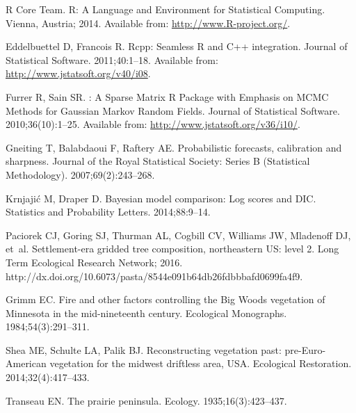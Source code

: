 \documentclass[10pt,letterpaper]{article}
\begin{document}
\begin{thebibliography}{10}
{R Core Team}. R: A Language and Environment for Statistical Computing.
\newblock Vienna, Austria; 2014.
\newblock Available from: \url{http://www.R-project.org/}.

Eddelbuettel D, Francois R.
\newblock Rcpp: {S}eamless {R} and {C}++ integration.
\newblock Journal of Statistical Software. 2011;40:1--18.
\newblock Available from: \url{http://www.jstatsoft.org/v40/i08}.

Furrer R, Sain SR.
: A Sparse Matrix {R} Package with Emphasis on {MCMC} Methods
  for {G}aussian {M}arkov Random Fields.
\newblock Journal of Statistical Software. 2010;36(10):1--25.
\newblock Available from: \url{http://www.jstatsoft.org/v36/i10/}.

Gneiting T, Balabdaoui F, Raftery AE.
\newblock Probabilistic forecasts, calibration and sharpness.
\newblock Journal of the Royal Statistical Society: Series B (Statistical
  Methodology). 2007;69(2):243--268.

Krnjaji\'{c} M, Draper D.
\newblock Bayesian model comparison: {L}og scores and {DIC}.
\newblock Statistics and Probability Letters. 2014;88:9--14.

Paciorek CJ, Goring SJ, Thurman AL, Cogbill CV, Williams JW, Mladenoff DJ,
  et~al.
\newblock Settlement-era gridded tree composition, northeastern {US}: level 2.
\newblock Long Term Ecological Research Network; 2016. http://dx.doi.org/10.6073/pasta/8544e091b64db26fdbbbafd0699fa4f9.

Grimm EC.
\newblock Fire and other factors controlling the {B}ig {W}oods vegetation of
  {M}innesota in the mid-nineteenth century.
\newblock Ecological Monographs. 1984;54(3):291--311.

Shea ME, Schulte LA, Palik BJ.
\newblock Reconstructing vegetation past: pre-{E}uro-{A}merican vegetation for
  the midwest driftless area, {USA}.
\newblock Ecological Restoration. 2014;32(4):417--433.

Transeau EN.
\newblock The prairie peninsula.
\newblock Ecology. 1935;16(3):423--437.

\end{thebibliography}
\end{document}
